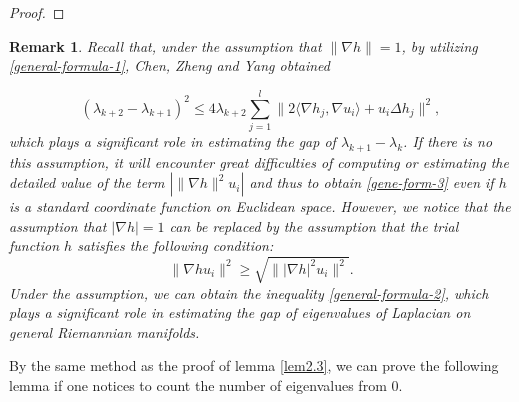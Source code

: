 \documentclass[12pt]{article}
\newtheorem{rem}[thm]{Remark}
\numberwithin{equation}{section}
\begin{document}
\begin{proof}
\end{proof}


\begin{rem}

Recall that, under the assumption that $\|\nabla h\|=1$, by utilizing \eqref{general-formula-1}, Chen, Zheng and Yang \cite{CZY} obtained


\begin{equation}\label{gene-form-3}\left(\lambda_{k+2}-\lambda_{k+1}\right)^{2}
\leq4\lambda_{k+2}\sum_{j=1}^{l}\|2\langle\nabla h_{j},\nabla u_{i}\rangle+u_{i}\Delta h_{j}\|^{2},\end{equation} which plays a significant  role in estimating the gap of $\lambda_{k+1}-\lambda_{k}$.  If there is no this assumption, it will encounter great difficulties of computing or estimating the detailed value of the term $|\|\nabla h\|^{2}u_{i}|$ and thus to obtain \eqref{gene-form-3} even if $h$ is a standard coordinate function on Euclidean space. However, we notice that the assumption that $|\nabla h|=1$ can be replaced by the assumption that the trial function $h$ satisfies the following condition: \begin{equation*}\|\nabla hu_{i}\|^{2}\geq\sqrt{\||\nabla h|^{2}u_{i}\|^{2}}.\end{equation*} Under the assumption, we can obtain the inequality \eqref{general-formula-2}, which plays a significant role in estimating the gap of eigenvalues of Laplacian on general Riemannian manifolds.



\end{rem}

By the same method as the proof of lemma \ref{lem2.3}, we can prove the following lemma if one notices to count the number of eigenvalues from $0$.
\end{document}
